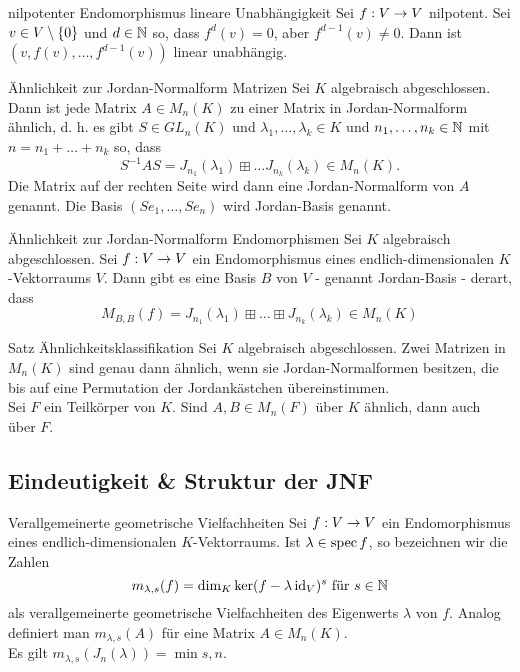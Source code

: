 \documentclass[main.tex]{subfiles}
\begin{document}
\begin{karte}{nilpotenter Endomorphismus lineare Unabhängigkeit}
    Sei \(f : V \rightarrow V\) nilpotent. Sei \(v \in V\setminus \{0\}\)
    und \(d \in \mathbb{N}\) so, dass \(f^d(v) = 0\), aber \(f^{d-1}(v) \neq 0\).
    Dann ist \((v,f(v),\ldots, f^{d-1}(v))\) linear unabhängig.
\end{karte}

\begin{karte}{Ähnlichkeit zur Jordan-Normalform Matrizen}
    Sei \(K\) algebraisch abgeschlossen. Dann ist jede Matrix \(A \in M_n(K)\)
    zu einer Matrix in Jordan-Normalform ähnlich, d. h. es gibt \(S \in GL_n(K)\)
    und \(\lambda_1, \ldots, \lambda_k \in K\) und \(n_1, \ldots, n_k \in \mathbb{N}\)
    mit \(n = n_1 + \ldots + n_k\) so, dass
    \[ S^{-1}AS = J_{n_1}(\lambda_1) \boxplus \ldots J_{n_k}(\lambda_k) \in M_n(K). \]
    Die Matrix auf der rechten Seite wird dann eine Jordan-Normalform von \(A\)
    genannt. Die Basis \((Se_1, \ldots, Se_n)\) wird Jordan-Basis genannt.
\end{karte}

\begin{karte}{Ähnlichkeit zur Jordan-Normalform Endomorphismen}
    Sei \(K\) algebraisch abgeschlossen. Sei \(f : V \rightarrow V\) ein Endomorphismus
    eines endlich-dimensionalen \(K\)-Vektorraums \(V\). Dann gibt es eine Basis
    \(B\) von \(V\) - genannt Jordan-Basis - derart, dass
    \[ M_ {B,B}(f) = J_{n_1}(\lambda_1) \boxplus \ldots \boxplus J_{n_k}(\lambda_k)
    \in M_n(K) \]
\end{karte}

\begin{karte}{Satz Ähnlichkeitsklassifikation}
    Sei \(K\) algebraisch abgeschlossen. Zwei Matrizen in \(M_n(K)\) sind genau dann 
    ähnlich, wenn sie Jordan-Normalformen besitzen, die bis auf eine Permutation der 
    Jordankästchen übereinstimmen.\\
    Sei \(F\) ein Teilkörper von \(K\). Sind \(A, B \in M_n(F)\) über \(K\)
    ähnlich, dann auch über \(F\).
\end{karte}

\subsection*{Eindeutigkeit \& Struktur der JNF}

\begin{karte}{Verallgemeinerte geometrische Vielfachheiten}
    Sei \(f : V \rightarrow V\) ein Endomorphismus eines endlich-dimensionalen
    \(K\)-Vektorraums. Ist \(\lambda \in \operatorname{spec} f\), so bezeichnen wir die Zahlen
    \[ m_{\lambda, s}(f) = \dim_K \ker(f-\lambda \operatorname{id}_V)^s \text{ für } s \in \mathbb{N} \]
    als verallgemeinerte geometrische Vielfachheiten des Eigenwerts
    \(\lambda\) von \(f\). Analog definiert man \(m_{\lambda, s}(A)\) für eine Matrix
    \(A \in M_n(K)\).\\
    Es gilt \(m_{\lambda, s}(J_n(\lambda)) = \min{s,n}\).
\end{karte}
\end{document}
